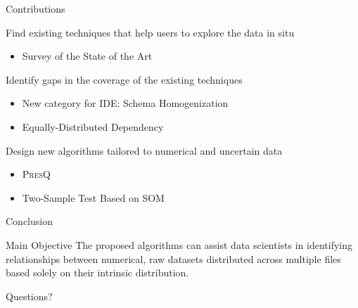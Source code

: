 \documentclass[10pt,compress]{beamer}
\newcommand{\PresQ}[0]{\textsc{PresQ}\xspace}
\begin{document}
\begin{frame}{Contributions}

\begin{alertblock}{ Find existing techniques that help users to explore the data in situ}
    \begin{itemize}
        \item Survey of the State of the Art
    \end{itemize}
\end{alertblock}

\begin{alertblock}{ Identify gaps in the coverage of the existing techniques}
    \begin{itemize}
        \item New category for IDE: \alert{Schema Homogenization}
        \item Equally-Distributed Dependency
    \end{itemize}
\end{alertblock}

\begin{alertblock}{ Design new algorithms tailored to numerical and uncertain data}
    \begin{itemize}
        \item \PresQ
        \item Two-Sample Test Based on SOM
    \end{itemize}
\end{alertblock}

\end{frame}

\begin{frame}{Conclusion}

\begin{block}{ Main Objective}
    The proposed algorithms can assist data scientists in identifying relationships
    between numerical, raw datasets distributed across multiple files
    based solely on their intrinsic distribution.
\end{block}

\end{frame}

\appendix

{
\begin{frame}[standout]
  \huge Questions?
\end{frame}
}
\end{document}
